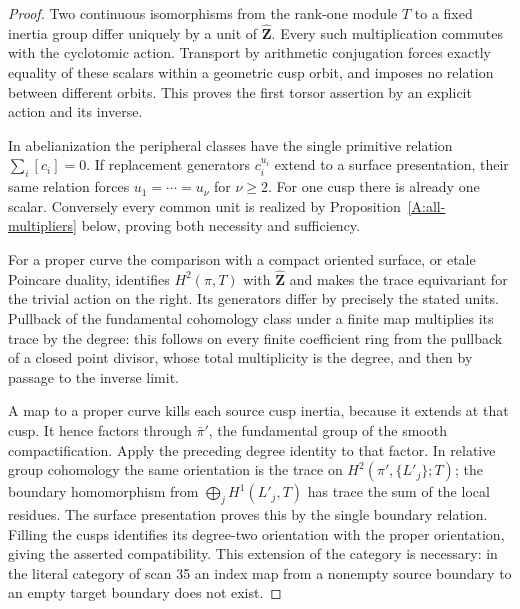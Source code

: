 \documentclass[11pt,oneside]{article}
\begin{document}
\begin{proof}
Two continuous isomorphisms from the rank-one module
$T$ to a fixed inertia group differ uniquely by a unit
of $\widehat{\mathbf Z}$.  Every such multiplication
commutes with the cyclotomic action.  Transport by
arithmetic conjugation forces exactly equality of
these scalars within a geometric cusp orbit, and
imposes no relation between different orbits.  This
proves the first torsor assertion by an explicit action
and its inverse.

In abelianization the peripheral classes have the
single primitive relation $\sum_i[c_i]=0$.
If replacement generators $c_i^{u_i}$ extend to a
surface presentation, their same relation forces
$u_1=\cdots=u_\nu$ for $\nu\ge2$.  For one cusp
there is already one scalar.  Conversely every common
unit is realized by Proposition~\ref{A:all-multipliers}
below, proving both necessity and sufficiency.

For a proper curve the comparison with a compact
oriented surface, or etale Poincare duality, identifies
$H^2(\pi,T)$ with $\widehat{\mathbf Z}$ and makes
the trace equivariant for the trivial action on the
right.  Its generators differ by precisely the stated
units.  Pullback of the fundamental cohomology class
under a finite map multiplies its trace by the degree:
this follows on every finite coefficient ring from
the pullback of a closed point divisor, whose total
multiplicity is the degree, and then by passage to the
inverse limit.

A map to a proper curve kills each source cusp
inertia, because it extends at that cusp.  It hence
factors through $\bar\pi'$, the fundamental group
of the smooth compactification.  Apply the preceding
degree identity to that factor.  In relative group
cohomology the same orientation is the trace on
$H^2(\pi',\{L'_j\};T)$; the boundary homomorphism
from $\bigoplus_jH^1(L'_j,T)$ has trace the sum of
the local residues.  The surface presentation proves
this by the single boundary relation.  Filling the
cusps identifies its degree-two orientation with the
proper orientation, giving the asserted compatibility.
This extension of the category is necessary: in the
literal category of scan 35 an index map from a
nonempty source boundary to an empty target boundary
does not exist.
\end{proof}
\end{document}
